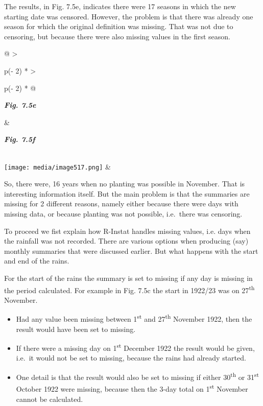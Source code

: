 \documentclass[
  letterpaper,
  DIV=11,
  numbers=noendperiod]{scrreprt}
\begin{document}
The results, in Fig. 7.5e, indicates there were 17 seasons in which the
new starting date was censored. However, the problem is that there was
already one season for which the original definition was missing. That
was not due to censoring, but because there were also missing values in
the first season.

\begin{longtable}[]{@{}
  >{\raggedright\arraybackslash}p{(\columnwidth - 2\tabcolsep) * }
  >{\raggedright\arraybackslash}p{(\columnwidth - 2\tabcolsep) * }@{}}
\toprule\noalign{}
\begin{minipage}[b]{\linewidth}\raggedright
\textbf{\emph{Fig. 7.5e}}
\end{minipage} & \begin{minipage}[b]{\linewidth}\raggedright
\textbf{\emph{Fig. 7.5f}}
\end{minipage} \\
\midrule\noalign{}
\endhead
\bottomrule\noalign{}
\endlastfoot
\texttt{[image: media/image517.png]}
& \\
\end{longtable}

So, there were, 16 years when no planting was possible in November. That
is interesting information itself. But the main problem is that the
summaries are missing for 2 different reasons, namely either because
there were days with missing data, or because planting was not possible,
i.e.~there was censoring.

To proceed we fist explain how R-Instat handles missing values, i.e.
days when the rainfall was not recorded. There are various options when
producing (say) monthly summaries that were discussed earlier. But what
happens with the start and end of the rains.

For the start of the rains the summary is set to missing if any day is
missing in the period calculated. For example in Fig. 7.5c the start in
1922/23 was on 27\textsuperscript{th} November.

\begin{itemize}
\item
  Had any value been missing between 1\textsuperscript{st} and
  27\textsuperscript{th} November 1922, then the result would have been
  set to missing.
\item
  If there were a missing day on 1\textsuperscript{st} December 1922 the
  result would be given, i.e.~it would not be set to missing, because
  the rains had already started.
\item
  One detail is that the result would also be set to missing if either
  30\textsuperscript{th} or 31\textsuperscript{st} October 1922 were
  missing, because then the 3-day total on 1\textsuperscript{st}
  November cannot be calculated.
\end{itemize}
\end{document}
